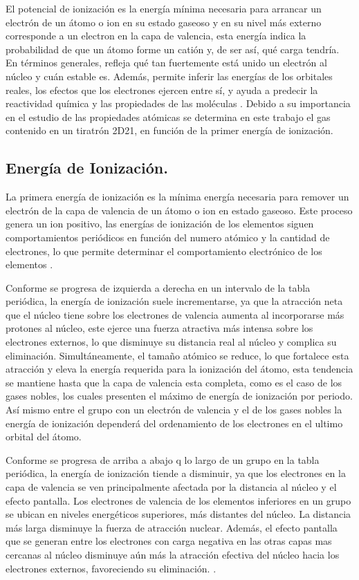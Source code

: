
El potencial de ionización es la energía mínima necesaria para arrancar un electrón de un átomo o ion en su estado gaseoso y en su nivel más externo corresponde a un electron en la capa de valencia, esta energía  indica la probabilidad de que un átomo forme un catión y, de ser así, qué carga tendría. En términos generales, refleja qué tan fuertemente está unido un electrón al núcleo y cuán estable es. Además, permite inferir las energías de los orbitales reales, los efectos que los electrones ejercen entre sí, y ayuda a predecir la reactividad química y las propiedades de las moléculas \cite{emily}. Debido a su importancia en el estudio de las propiedades atómicas se determina en este trabajo el gas contenido en un tiratrón 2D21, en función de la primer energía de ionización.  

\subsection{Energía de Ionización.}

La primera energía de ionización es la mínima energía necesaria para remover un electrón de la capa de valencia de un átomo o ion en estado gaseoso. Este proceso genera un ion positivo, las energías de ionización de los elementos siguen comportamientos periódicos en función del numero atómico y la cantidad de electrones, lo que permite determinar el comportamiento electrónico de los elementos \cite{libretexts}.


Conforme se progresa de izquierda a derecha en un intervalo de la tabla periódica, la energía de ionización suele incrementarse, ya que la atracción neta que el núcleo tiene sobre los electrones de valencia aumenta al incorporarse más protones al núcleo, este ejerce una fuerza atractiva más intensa sobre los electrones externos, lo que disminuye su distancia real al núcleo  y complica su eliminación. Simultáneamente, el tamaño atómico se reduce, lo que fortalece esta atracción y eleva la energía requerida para la ionización del átomo, esta tendencia se mantiene hasta que la capa de valencia esta completa, como es el caso de los gases nobles, los cuales presenten el máximo de energía de ionización por periodo. Así mismo entre el grupo con un electrón de valencia y el de los gases nobles la energía de ionización dependerá del ordenamiento de los electrones en el ultimo orbital del átomo.

Conforme se progresa de arriba a abajo q lo largo de un grupo en la tabla periódica,  la energía de ionización tiende a disminuir, ya que los electrones en la capa de valencia se ven principalmente afectada por la distancia al núcleo y el efecto pantalla. Los electrones de valencia de los elementos inferiores en un grupo se ubican en niveles energéticos superiores, más distantes del núcleo. La distancia más larga disminuye la fuerza de atracción nuclear. Además, el efecto pantalla que se generan entre los electrones con carga negativa en las otras capas mas cercanas al núcleo disminuye aún más la atracción efectiva del núcleo hacia los electrones externos, favoreciendo su eliminación. \cite{petrucci}. 

